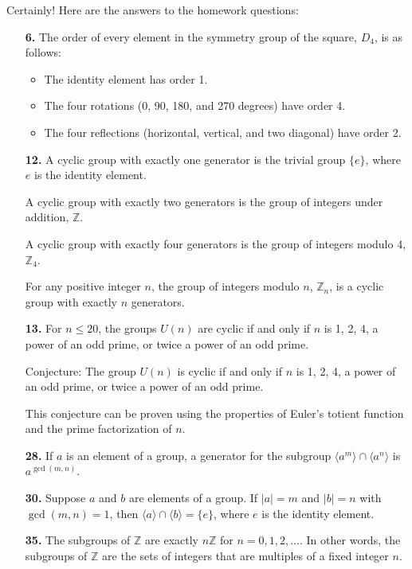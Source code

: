Certainly! Here are the answers to the homework questions:

\begin{enumerate}

\item[{\bf 6.}]
The order of every element in the symmetry group of the square, $D_4$, is as follows:
\begin{itemize}
\item The identity element has order 1.
\item The four rotations (0, 90, 180, and 270 degrees) have order 4.
\item The four reflections (horizontal, vertical, and two diagonal) have order 2.
\end{itemize}

\item[{\bf 12.}]
A cyclic group with exactly one generator is the trivial group $\{e\}$, where $e$ is the identity element. 

A cyclic group with exactly two generators is the group of integers under addition, $\mathbb{Z}$.

A cyclic group with exactly four generators is the group of integers modulo 4, $\mathbb{Z}_4$.

For any positive integer $n$, the group of integers modulo $n$, $\mathbb{Z}_n$, is a cyclic group with exactly $n$ generators.

\item[{\bf 13.}]
For $n \leq 20$, the groups $U(n)$ are cyclic if and only if $n$ is 1, 2, 4, a power of an odd prime, or twice a power of an odd prime. 

Conjecture: The group $U(n)$ is cyclic if and only if $n$ is 1, 2, 4, a power of an odd prime, or twice a power of an odd prime.

This conjecture can be proven using the properties of Euler's totient function and the prime factorization of $n$.

\item[{\bf 28.}]
If $a$ is an element of a group, a generator for the subgroup $\langle a^m \rangle \cap \langle a^n \rangle$ is $a^{\gcd(m,n)}$.

\item[{\bf 30.}]
Suppose $a$ and $b$ are elements of a group. If $|a| = m$ and $|b| = n$ with $\gcd(m,n) = 1$, then $\langle a \rangle \cap \langle b \rangle = \{ e \}$, where $e$ is the identity element.

\item[{\bf 35.}]
The subgroups of $\mathbb{Z}$ are exactly $n\mathbb{Z}$ for $n = 0, 1, 2, \ldots$. In other words, the subgroups of $\mathbb{Z}$ are the sets of integers that are multiples of a fixed integer $n$.


\end{enumerate}
